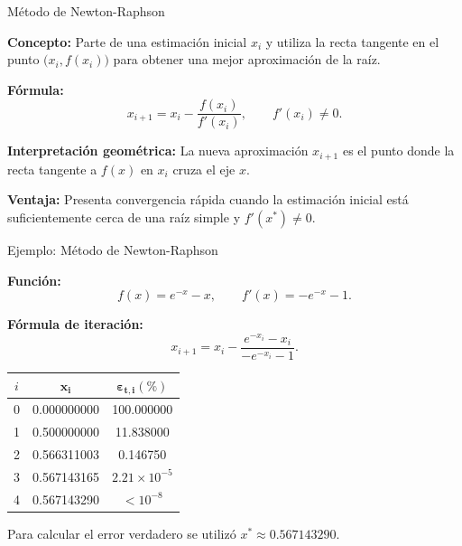 \documentclass[../../main.tex]{subfiles}
\begin{document}
\begin{frame}{Método de Newton-Raphson}

\textbf{Concepto:}
Parte de una estimación inicial \(x_i\) y utiliza la recta tangente
en el punto \(\bigl(x_i,f(x_i)\bigr)\) para obtener una mejor
aproximación de la raíz.

\vspace{0.8em}

\textbf{Fórmula:}
\[
x_{i+1}
=
x_i-\frac{f(x_i)}{f'(x_i)},
\qquad f'(x_i)\neq 0.
\]

\vspace{0.8em}

\textbf{Interpretación geométrica:}
La nueva aproximación \(x_{i+1}\) es el punto donde la recta
tangente a \(f(x)\) en \(x_i\) cruza el eje \(x\).

\vspace{0.5em}

\textbf{Ventaja:}
Presenta convergencia rápida cuando la estimación inicial está
suficientemente cerca de una raíz simple y \(f'(x^*)\neq0\).

\end{frame}



\begin{frame}{Ejemplo: Método de Newton-Raphson}

\textbf{Función:}
\[
f(x)=e^{-x}-x,
\qquad
f'(x)=-e^{-x}-1.
\]

\textbf{Fórmula de iteración:}
\[
x_{i+1}
=
x_i-\frac{e^{-x_i}-x_i}{-e^{-x_i}-1}.
\]

\centering
\small

\begin{tabular}{|c|c|c|}
\hline
\textbf{\(i\)} & \(\boldsymbol{x_i}\) &
\(\boldsymbol{\varepsilon_{t,i}(\%)}\) \\ \hline
0 & 0.000000000 & 100.000000 \\ 
1 & 0.500000000 & 11.838000 \\ 
2 & 0.566311003 & 0.146750 \\ 
3 & 0.567143165 & \(2.21\times10^{-5}\) \\ 
4 & 0.567143290 & \(<10^{-8}\) \\ \hline
\end{tabular}

\vspace{0.4em}

\raggedright
Para calcular el error verdadero se utilizó \( x^*\approx0.567143290.\)

\end{frame}
\end{document}
